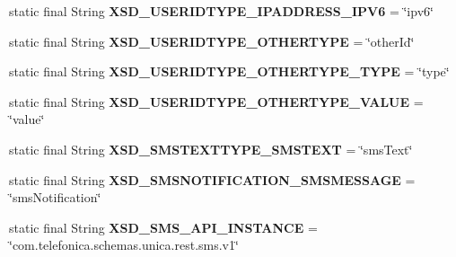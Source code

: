 \begin{DoxyCompactItemize}
\item 
\hypertarget{classcom_1_1bluevia_1_1commons_1_1parser_1_1xml_1_1XmlConstants_ad23414f3e63ba3340bc3c2932783dc5f}{
static final String {\bfseries XSD\_\-USERIDTYPE\_\-IPADDRESS\_\-IPV6} = \char`\"{}ipv6\char`\"{}}
\label{classcom_1_1bluevia_1_1commons_1_1parser_1_1xml_1_1XmlConstants_ad23414f3e63ba3340bc3c2932783dc5f}

\item 
\hypertarget{classcom_1_1bluevia_1_1commons_1_1parser_1_1xml_1_1XmlConstants_a2804411a4e81bece35db8278ba93e4c8}{
static final String {\bfseries XSD\_\-USERIDTYPE\_\-OTHERTYPE} = \char`\"{}otherId\char`\"{}}
\label{classcom_1_1bluevia_1_1commons_1_1parser_1_1xml_1_1XmlConstants_a2804411a4e81bece35db8278ba93e4c8}

\item 
\hypertarget{classcom_1_1bluevia_1_1commons_1_1parser_1_1xml_1_1XmlConstants_a2c3efe59481c581edbba1d7611ac8a1e}{
static final String {\bfseries XSD\_\-USERIDTYPE\_\-OTHERTYPE\_\-TYPE} = \char`\"{}type\char`\"{}}
\label{classcom_1_1bluevia_1_1commons_1_1parser_1_1xml_1_1XmlConstants_a2c3efe59481c581edbba1d7611ac8a1e}

\item 
\hypertarget{classcom_1_1bluevia_1_1commons_1_1parser_1_1xml_1_1XmlConstants_a9e5a677a68184619ce939873b4c4dc91}{
static final String {\bfseries XSD\_\-USERIDTYPE\_\-OTHERTYPE\_\-VALUE} = \char`\"{}value\char`\"{}}
\label{classcom_1_1bluevia_1_1commons_1_1parser_1_1xml_1_1XmlConstants_a9e5a677a68184619ce939873b4c4dc91}

\item 
\hypertarget{classcom_1_1bluevia_1_1commons_1_1parser_1_1xml_1_1XmlConstants_ade233564606ab6da35a70a2db0083e76}{
static final String {\bfseries XSD\_\-SMSTEXTTYPE\_\-SMSTEXT} = \char`\"{}smsText\char`\"{}}
\label{classcom_1_1bluevia_1_1commons_1_1parser_1_1xml_1_1XmlConstants_ade233564606ab6da35a70a2db0083e76}

\item 
\hypertarget{classcom_1_1bluevia_1_1commons_1_1parser_1_1xml_1_1XmlConstants_a038d1198c6af4530062a5fd500238638}{
static final String {\bfseries XSD\_\-SMSNOTIFICATION\_\-SMSMESSAGE} = \char`\"{}smsNotification\char`\"{}}
\label{classcom_1_1bluevia_1_1commons_1_1parser_1_1xml_1_1XmlConstants_a038d1198c6af4530062a5fd500238638}

\item 
\hypertarget{classcom_1_1bluevia_1_1commons_1_1parser_1_1xml_1_1XmlConstants_a54defac4910851c4ec5f48dc21ed812a}{
static final String {\bfseries XSD\_\-SMS\_\-API\_\-INSTANCE} = \char`\"{}com.telefonica.schemas.unica.rest.sms.v1\char`\"{}}
\label{classcom_1_1bluevia_1_1commons_1_1parser_1_1xml_1_1XmlConstants_a54defac4910851c4ec5f48dc21ed812a}


\end{DoxyCompactItemize}
